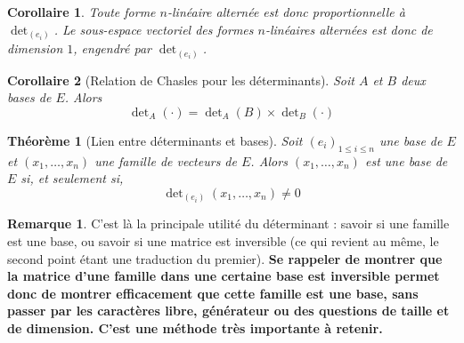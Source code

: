 \documentclass[french]{book}
\theoremstyle{plain}
\newtheorem{thm}{Théorème}[chapter]
\newtheorem{cor}{Corollaire}[chapter]
\theoremstyle{definition}
\newtheorem{rmq}{Remarque}[chapter]
\theoremstyle{remark}
\begin{document}
\begin{cor}
	Toute forme $n$-linéaire alternée est donc proportionnelle à $\det\nolimits_{(e_i)}$. Le sous-espace vectoriel des formes $n$-linéaires alternées est donc de dimension $1$, engendré par $\det\nolimits_{(e_i)}$.
\end{cor}
\begin{cor}[Relation de Chasles pour les déterminants]
	Soit $A$ et $B$ deux bases de $E$. Alors $$\det\nolimits_{A}(\cdot)=\det\nolimits_{A}(B)\times\det\nolimits_{B}(\cdot)$$
\end{cor}
\begin{thm}[Lien entre déterminants et bases]
	Soit $(e_i)_{1\leqslant i\leqslant n}$ une base de $E$ et $(x_1,\ldots,x_n)$ une famille de vecteurs de $E$. Alors $(x_1,\ldots,x_n)$ est une base de $E$ si, et seulement si, $$\det\nolimits_{(e_i)}(x_1,\ldots,x_n)\ne 0$$
\end{thm}
\begin{rmq} C'est là la principale utilité du déterminant : savoir si une famille est une base, ou savoir si une matrice est inversible (ce qui revient au même, le second point étant une traduction du premier).\textbf{ Se rappeler de montrer que la matrice d'une famille dans une certaine base est inversible permet donc de montrer efficacement que cette famille est une base, sans passer par les caractères libre, générateur ou des questions de taille et de dimension. C'est une méthode très importante à retenir.} \end{rmq}
\end{document}
